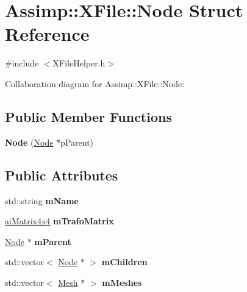 \hypertarget{struct_assimp_1_1_x_file_1_1_node}{\section{Assimp\+:\+:X\+File\+:\+:Node Struct Reference}
\label{struct_assimp_1_1_x_file_1_1_node}
}


{\ttfamily \#include $<$X\+File\+Helper.\+h$>$}



Collaboration diagram for Assimp\+:\+:X\+File\+:\+:Node\+:
\subsection*{Public Member Functions}
\begin{DoxyCompactItemize}
\item 
\hypertarget{struct_assimp_1_1_x_file_1_1_node_a8f510f9c7558a4e2d7f237f905eb990f}{{\bfseries Node} (\hyperlink{struct_assimp_1_1_x_file_1_1_node}{Node} $\ast$p\+Parent)}\label{struct_assimp_1_1_x_file_1_1_node_a8f510f9c7558a4e2d7f237f905eb990f}

\end{DoxyCompactItemize}
\subsection*{Public Attributes}
\begin{DoxyCompactItemize}
\item 
\hypertarget{struct_assimp_1_1_x_file_1_1_node_a67411d40b387a6bcdf9256a7631434bc}{std\+::string {\bfseries m\+Name}}\label{struct_assimp_1_1_x_file_1_1_node_a67411d40b387a6bcdf9256a7631434bc}

\item 
\hypertarget{struct_assimp_1_1_x_file_1_1_node_ab253d4f633c207920183e175f741b73b}{\hyperlink{structai_matrix4x4}{ai\+Matrix4x4} {\bfseries m\+Trafo\+Matrix}}\label{struct_assimp_1_1_x_file_1_1_node_ab253d4f633c207920183e175f741b73b}

\item 
\hypertarget{struct_assimp_1_1_x_file_1_1_node_a5aaaf86c008e5f3367f95afb99477d17}{\hyperlink{struct_assimp_1_1_x_file_1_1_node}{Node} $\ast$ {\bfseries m\+Parent}}\label{struct_assimp_1_1_x_file_1_1_node_a5aaaf86c008e5f3367f95afb99477d17}

\item 
\hypertarget{struct_assimp_1_1_x_file_1_1_node_a6f12f379fde8db65f079622f2b3a02fd}{std\+::vector$<$ \hyperlink{struct_assimp_1_1_x_file_1_1_node}{Node} $\ast$ $>$ {\bfseries m\+Children}}\label{struct_assimp_1_1_x_file_1_1_node_a6f12f379fde8db65f079622f2b3a02fd}

\item 
\hypertarget{struct_assimp_1_1_x_file_1_1_node_aca4f0abc485e4138bd14017d0a01dd91}{std\+::vector$<$ \hyperlink{struct_assimp_1_1_x_file_1_1_mesh}{Mesh} $\ast$ $>$ {\bfseries m\+Meshes}}\label{struct_assimp_1_1_x_file_1_1_node_aca4f0abc485e4138bd14017d0a01dd91}

\end{DoxyCompactItemize}


